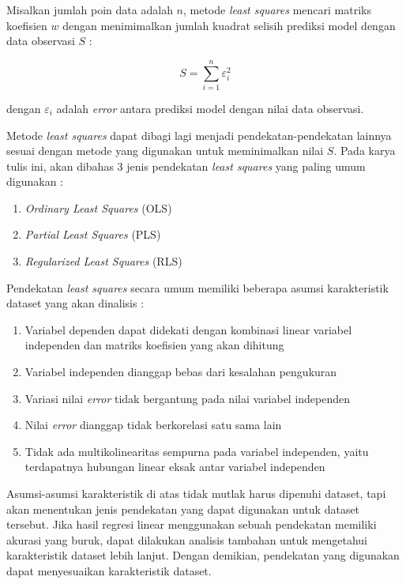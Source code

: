 Misalkan jumlah poin data adalah $n$, metode \textit{least squares} mencari matriks koefisien $w$ dengan menimimalkan jumlah kuadrat selisih prediksi model dengan data observasi $S$ \cite{dekking2005}:

\begin{equation}
\label{eq:sumerrorreglinear}
S = \sum_{i = 1}^{n}\varepsilon_{i}^2
\end{equation}

dengan $\varepsilon_i$ adalah \textit{error} antara prediksi model dengan nilai data observasi.

Metode \textit{least squares} dapat dibagi lagi menjadi pendekatan-pendekatan lainnya sesuai dengan metode yang digunakan untuk meminimalkan nilai $S$. Pada karya tulis ini, akan dibahas 3 jenis pendekatan \textit{least squares} yang paling umum digunakan :

\begin{enumerate}
	\item \textit{Ordinary Least Squares} (OLS)
	\item \textit{Partial Least Squares} (PLS)
	\item \textit{Regularized Least Squares} (RLS)
\end{enumerate}

Pendekatan \textit{least squares} secara umum memiliki beberapa asumsi karakteristik dataset yang akan dinalisis :

\begin{enumerate}
	\item Variabel dependen dapat didekati dengan kombinasi linear variabel independen dan matriks koefisien yang akan dihitung
	\item Variabel independen dianggap bebas dari kesalahan pengukuran
	\item Variasi nilai \textit{error} tidak bergantung pada nilai variabel independen
	\item Nilai \textit{error} dianggap tidak berkorelasi satu sama lain
	\item Tidak ada multikolinearitas sempurna pada variabel independen, yaitu terdapatnya hubungan linear eksak antar variabel independen
\end{enumerate}

Asumsi-asumsi karakteristik di atas tidak mutlak harus dipenuhi dataset, tapi akan menentukan jenis pendekatan yang dapat digunakan untuk dataset tersebut. Jika hasil regresi linear menggunakan sebuah pendekatan memiliki akurasi yang buruk, dapat dilakukan analisis tambahan untuk mengetahui karakteristik dataset lebih lanjut. Dengan demikian, pendekatan yang digunakan dapat menyesuaikan karakteristik dataset.

